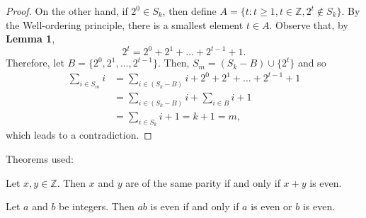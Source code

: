 \documentclass[12pt]{article}
\newcommand{\Z}{\mathbb{Z}}
\newenvironment{theorem}[2][Theorem]{\begin{trivlist}
		\item[\hskip \labelsep {\bfseries #1}\hskip \labelsep {\bfseries #2.}]}{\end{trivlist}}
\newenvironment{result}[2][Result]{\begin{trivlist}
			\item[\hskip \labelsep {\bfseries #1}\hskip \labelsep {\bfseries #2.}]}{\end{trivlist}}
\newenvironment{problem}[2][Problem]{\begin{trivlist}
		\item[\hskip \labelsep {\bfseries #1}\hskip \labelsep {\bfseries #2.}]}{\end{trivlist}}
\begin{document}
\begin{problem}{40}
\begin{result}{40}
\begin{proof}
	On the other hand, if $2^{0}\in S_{k}$, then define $A = \{t:t\geq 1, t\in \Z, 2^{t}\notin S_{k}\}$. By the Well-ordering principle, there is a smallest element $t\in A$. Observe that, by \textbf{Lemma 1}, 
	\begin{equation*}
		2^{t} = 2^{0} + 2^{1} + \ldots +2^{t-1} + 1.
	\end{equation*}
Therefore, let $B=\{2^{0},2^{1},\ldots,2^{t-1}\} $. Then, $S_{m} = (S_{k}-B) \cup \{2^{t}\}$ 
and so
\begin{align*}
	\sum_{i\in S_{m}} i &= \sum_{i\in (S_{k}-B)} i + 2^{0} + 2^{1} + \ldots +2^{t-1} + 1\\
	&=\sum_{i\in (S_{k}-B)} i + \sum_{i\in B} i + 1\\
	&= \sum_{i\in S_{k}} i +1 = k+1 = m,
\end{align*}
which leads to a contradiction.
	\end{proof}
\end{result}
\end{problem}


Theorems used:
\begin{theorem}{3.16}
	Let $x,y \in \Z$. Then $x$ and $y$ are of the same parity if and only if $x+y$ is even.
\end{theorem}

\begin{theorem}{3.17}
	Let $a$ and $b$ be integers. Then $ab$ is even if and only if $a$ is even or $b$ is even.
\end{theorem}
\end{document}
